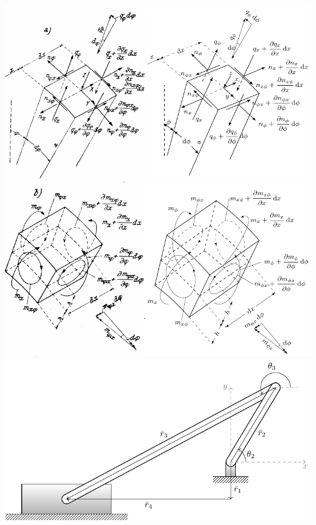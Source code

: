     \clearpage
    \begin{center}
        \includegraphics[width=0.8\linewidth]{./TikZimages/TikZ7.pdf}\\
        \vfill
        \includegraphics[width=0.8\linewidth]{./TikZimages/TikZ8.pdf}\\
        \vfill
        \includegraphics[width=0.8\linewidth]{./TikZimages/TikZ9.pdf}
    \end{center}

